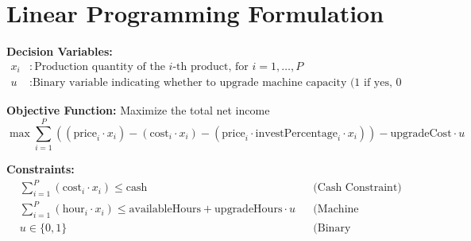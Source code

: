 \documentclass{article}
\begin{document}
\section*{Linear Programming Formulation}

\textbf{Decision Variables:}
\begin{align*}
x_i &: \text{Production quantity of the } i\text{-th product, for } i = 1, \ldots, P \\
u &: \text{Binary variable indicating whether to upgrade machine capacity (1 if yes, 0 if no)}
\end{align*}

\textbf{Objective Function:} Maximize the total net income
\[
\max \sum_{i=1}^{P} \left((\text{price}_i \cdot x_i) - (\text{cost}_i \cdot x_i) - (\text{price}_i \cdot \text{investPercentage}_i \cdot x_i)\right) - \text{upgradeCost} \cdot u
\]

\textbf{Constraints:}
\begin{align*}
& \sum_{i=1}^{P} (\text{cost}_i \cdot x_i) \leq \text{cash} && \text{(Cash Constraint)} \\
& \sum_{i=1}^{P} (\text{hour}_i \cdot x_i) \leq \text{availableHours} + \text{upgradeHours} \cdot u && \text{(Machine Capacity Constraint)} \\
& u \in \{0,1\} && \text{(Binary Constraint)}
\end{align*}
\end{document}
